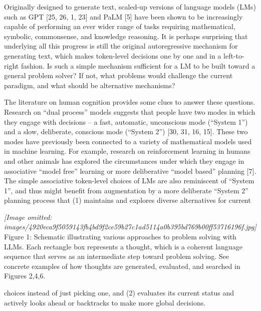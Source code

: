 \documentclass[
]{article}
\begin{document}
Originally designed to generate text, scaled-up versions of language
models (LMs) such as GPT {[}25, 26, 1, 23{]} and PaLM {[}5{]} have been
shown to be increasingly capable of performing an ever wider range of
tasks requiring mathematical, symbolic, commonsense, and knowledge
reasoning. It is perhaps surprising that underlying all this progress is
still the original autoregressive mechanism for generating text, which
makes token-level decisions one by one and in a left-to-right fashion.
Is such a simple mechanism sufficient for a LM to be built toward a
general problem solver? If not, what problems would challenge the
current paradigm, and what should be alternative mechanisms?

The literature on human cognition provides some clues to answer these
questions. Research on ``dual process'' models suggests that people have
two modes in which they engage with decisions -- a fast, automatic,
unconscious mode (``System 1'') and a slow, deliberate, conscious mode
(``System 2'') {[}30, 31, 16, 15{]}. These two modes have previously
been connected to a variety of mathematical models used in machine
learning. For example, research on reinforcement learning in humans and
other animals has explored the circumstances under which they engage in
associative ``model free'' learning or more deliberative ``model based''
planning {[}7{]}. The simple associative token-level choices of LMs are
also reminiscent of ``System 1'', and thus might benefit from
augmentation by a more deliberate ``System 2'' planning process that (1)
maintains and explores diverse alternatives for current

\textit{[Image omitted: images/4920eca9f5059143fb4bd9f2ce59b27c1ad5114a0b395bd769b00ff53716196f.jpg]}\\
Figure 1: Schematic illustrating various approaches to problem solving
with LLMs. Each rectangle box represents a thought, which is a coherent
language sequence that serves as an intermediate step toward problem
solving. See concrete examples of how thoughts are generated, evaluated,
and searched in Figures 2,4,6.

choices instead of just picking one, and (2) evaluates its current
status and actively looks ahead or backtracks to make more global
decisions.
\end{document}
